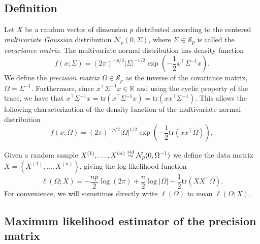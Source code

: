 \subsection{Definition}
Let $X$ be a random vector of dimension $p$ distributed according to the centered \textit{multivariate Gaussian} distribution $\mathcal{N}_p(0, \Sigma)$, where $\Sigma \in \mathcal{S}_p$ is called the \textit{covariance matrix}. The multivariate normal distribution has density function
\begin{equation*}
    f(x; \Sigma) = (2\pi)^{-p/2} |\Sigma|^{-1/2} \exp\left(-\frac{1}{2} x^\top\Sigma^{-1}x\right).
\end{equation*}
We define the \textit{precision matrix} $\Omega \in \mathcal{S}_p$ as the inverse of the covariance matrix, $\Omega = \Sigma^{-1}$. Furthermore, since $x^\top\Sigma^{-1} x \in \mathbb{R}$ and using the cyclic property of the trace, we have that $x^\top\Sigma^{-1} x = \text{tr}\left(x^\top\Sigma^{-1} x\right) = \text{tr}\left(xx^\top\Sigma^{-1}\right)$. This allows the following characterization of the density function of the multivariate normal distribution
\begin{equation} \label{eq-density-omega}
    f(x; \Omega) = (2\pi)^{-p/2} |\Omega|^{1/2} \exp\left(-\frac{1}{2} \text{tr}\left(xx^\top\Omega\right)\right),
\end{equation}

Given a random sample $X^{(1)}, \ldots, X^{(n)} \stackrel{iid}{\sim} \mathcal{N}_p(0, \Omega^{-1})$ we define the data matrix $X = (X^{(1)}, \ldots, X^{(n)})$, giving the log-likelihood function
\begin{equation} \label{eq-ll-omega}
    \ell(\Omega; X) = -\frac{np}{2}\log(2\pi) + \frac{n}{2}\log |\Omega| - \frac{1}{2} \text{tr}\left(XX^\top\Omega\right).
\end{equation}
For convenience, we will sometimes directly write $\ell(\Omega)$ to mean $\ell(\Omega; X)$.

\subsection{Maximum likelihood estimator of the precision matrix}

